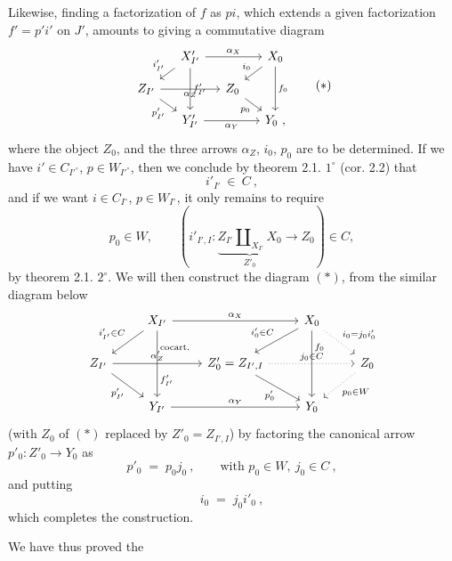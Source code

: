 Likewise, finding a factorization of $f$ as $pi$, which extends a given factorization $f'=p'i'$ on $J'$, amounts to giving a commutative diagram
\[
\begin{tikzcd}[column sep=small, row sep=small]
& X'_{I'} \arrow[rr, "\alpha_X"] \arrow[dl, "i'_{I'}"'] \arrow[dd, "f'_{I'}"] & & X_0 \arrow[dl, "i_0"'] \arrow[dd, "f_0"] \\
Z_{I'} \arrow[rr, "\alpha_Z"'] \arrow[dr, "p'_{I'}"'] & & Z_0 \arrow[dr, "p_0"'] & \\
& Y'_{I'} \arrow[rr, "\alpha_Y"'] & & Y_0\ ,
\end{tikzcd}
\tag*{$(*)$}
\]
where the object $Z_0$, and the three arrows $\alpha_Z$, $i_0$, $p_0$ are to be determined. If we have $i'\in C_{I'^\circ}$, $p\in W_{I'^\circ}$, %
then we conclude by theorem 2.1. $1^\circ$ (cor. 2.2) that
\[
i'_{I'}\ \in\ C\ ,
\]
and if we want $i\in C_{I^\circ}$, $p\in W_{I^\circ}$, it only remains to require
\[
p_0\in W, \qquad (i'_{I',I}:\underbrace{Z_{I'}\amalg_{X_{I'}}X_0}_{Z'_0}\longrightarrow Z_0)\in C,
\]
by theorem 2.1. $2^\circ$. We will then construct the diagram $(*)$, from the similar diagram below
\[
\begin{tikzcd}
& X_{I'} \arrow[rr, "\alpha_X"] \arrow[dl, "i'_{I'}\in C"'] \arrow[dd, "\text{cocart.}" {pos=0.25}, "f'_{I'}" {pos=0.75}] & & X_0 \arrow[dl, "i'_0\in C"'] \arrow[dd, "f_0" {pos=0.25}] \arrow[dr, dotted, "i_0=j_0i'_0"] & \\
Z_{I'} \arrow[rr, "\alpha'_Z"] \arrow[dr, "p'_{I'}"'] & & Z'_0=Z_{I',I} \arrow[rr, dotted, "j_0\in C"] \arrow[dr, "p'_0"'] & & Z_0 \arrow[dl, dotted, "p_0\in W"] \\
& Y_{I'} \arrow[rr, "\alpha_Y"] & & Y_0 &
\end{tikzcd}
\]
(with $Z_0$ of $(*)$ replaced by $Z'_0=Z_{I',I}$) by factoring the canonical arrow $p'_0:Z'_0\longrightarrow Y_0$ as
\[
p'_0 \;=\; p_0j_0\ , \qquad \text{with } p_0\in W,\ j_0\in C\ ,
\]
and putting
\[
i_0 \;=\; j_0i'_0\ ,
\]
which completes the construction.

We have thus proved the


